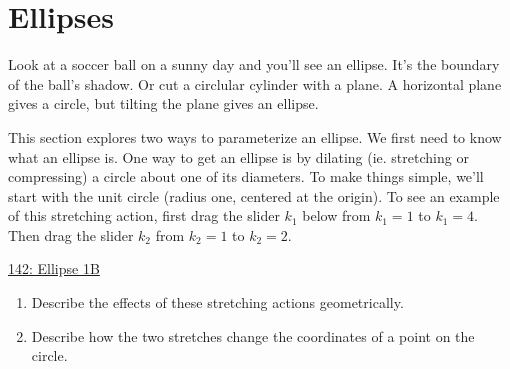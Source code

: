 \documentclass{ximera}
\begin{document}
\section{Ellipses}

Look at a soccer ball on a sunny day and you'll see an ellipse. It's the boundary of the ball's shadow. Or cut a circlular cylinder with a plane. A horizontal plane gives a circle, but tilting the plane gives an ellipse.

This section explores two ways to parameterize an ellipse. We first need to know what an ellipse is. One way to get an ellipse is by dilating (ie. stretching or compressing) a circle about one of its diameters. To make things simple, we'll start with the unit circle (radius one, centered at the origin). To see an example of this stretching action, first drag the slider $k_1$ below from $k_1=1$ to $k_1=4$. Then drag the slider $k_2$ from $k_2=1$ to $k_2=2$.

\begin{onlineOnly}
    \begin{center}
\end{center}
\end{onlineOnly}

\href{https://www.desmos.com/calculator/l2wiiamr0a}{142: Ellipse 1B}


\begin{question} \label{QLDkferedsf}
\begin{enumerate}
\item Describe the effects of these stretching actions geometrically.

\item Describe how the two stretches change the coordinates of a point on the circle.
\end{enumerate}
\end{question}
\end{document}
